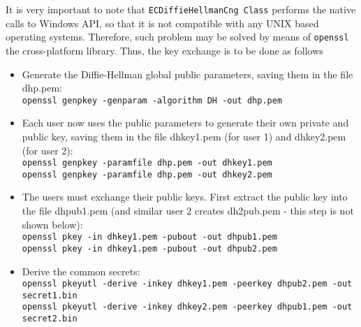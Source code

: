 It is very important to note that \texttt{ECDiffieHellmanCng Class} performs the native calls to
Windows API, so that it is not compatible with any UNIX based operating systems.
Therefore, such problem may be solved by means of \texttt{openssl} the cross-platform library.
Thus, the key exchange is to be done as follows
\begin{itemize}
    \item Generate the Diffie-Hellman global public parameters, saving them in the file dhp.pem: \\
    \texttt{openssl genpkey -genparam -algorithm DH -out dhp.pem }
    \item Each user now uses the public parameters to generate their own private and public key, 
    saving them in the file dhkey1.pem (for user 1) and dhkey2.pem (for user 2): \\
    \texttt{openssl genpkey -paramfile dhp.pem -out dhkey1.pem} \\
    \texttt{openssl genpkey -paramfile dhp.pem -out dhkey2.pem} \\
    \item The users must exchange their public keys. 
    First extract the public key into the file dhpub1.pem 
    (and similar user 2 creates dh2pub.pem - this step is not shown below): \\
    \texttt{openssl pkey -in dhkey1.pem -pubout -out dhpub1.pem} \\
    \texttt{openssl pkey -in dhkey1.pem -pubout -out dhpub2.pem}
    \item Derive the common secrets: \\
    \texttt{openssl pkeyutl -derive -inkey dhkey1.pem -peerkey dhpub2.pem -out secret1.bin} \\
    \texttt{openssl pkeyutl -derive -inkey dhkey2.pem -peerkey dhpub1.pem -out secret2.bin}
\end{itemize}